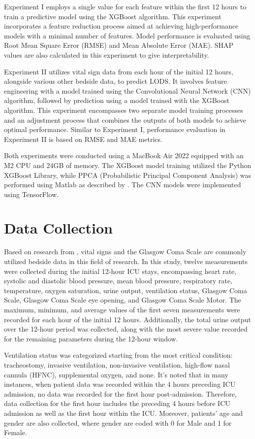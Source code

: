 \documentclass[12pt,a4paper,english
]{tunithesis}
\begin{document}
Experiment I employs a single value for each feature within the first 12 hours to train a predictive model using the XGBoost algorithm. This experiment incorporates a feature reduction process aimed at achieving high-performance models with a minimal number of features. Model performance is evaluated using Root Mean Square Error (RMSE) and Mean Absolute Error (MAE). SHAP values are also calculated in this experiment to give interpretability.

Experiment II utilizes vital sign data from each hour of the initial 12 hours, alongside various other bedside data, to predict LODS. It involves feature engineering with a model trained using the Convolutional Neural Network (CNN) algorithm, followed by prediction using a model trained with the XGBoost algorithm. This experiment encompasses two separate model training processes and an adjustment process that combines the outputs of both models to achieve optimal performance. Similar to Experiment I, performance evaluation in Experiment II is based on RMSE and MAE metrics.

Both experiments were conducted using a MacBook Air 2022 equipped with an M2 CPU and 24GB of memory. The XGBoost model training utilized the Python XGBoost Library, while PPCA (Probabilistic Principal Component Analysis) was performed using Matlab as described by \textcite{jakob2015}. The CNN models were implemented using TensorFlow.

\section{Data Collection}
Based on research from \textcite{asuroglu2021, johnson2013}, vital signs and the Glasgow Coma Scale are commonly utilized bedside data in this field of research. In this study, twelve measurements were collected during the initial 12-hour ICU stays, encompassing heart rate, systolic and diastolic blood pressure, mean blood pressure, respiratory rate, temperature, oxygen saturation, urine output, ventilation status, Glasgow Coma Scale, Glasgow Coma Scale eye opening, and Glasgow Coma Scale Motor. The maximum, minimum, and average values of the first seven measurements were recorded for each hour of the initial 12 hours. Additionally, the total urine output over the 12-hour period was collected, along with the most severe value recorded for the remaining parameters during the 12-hour window.

Ventilation status was categorized starting from the most critical condition: tracheostomy, invasive ventilation, non-invasive ventilation, high-flow nasal cannula (HFNC), supplemental oxygen, and none. It's noted that in many instances, when patient data was recorded within the 4 hours preceding ICU admission, no data was recorded for the first hour post-admission. Therefore, data collection for the first hour includes the preceding 4 hours before ICU admission as well as the first hour within the ICU. Moreover, patients' age and gender are also collected, where gender are coded with 0 for Male and 1 for Female.
\end{document}
